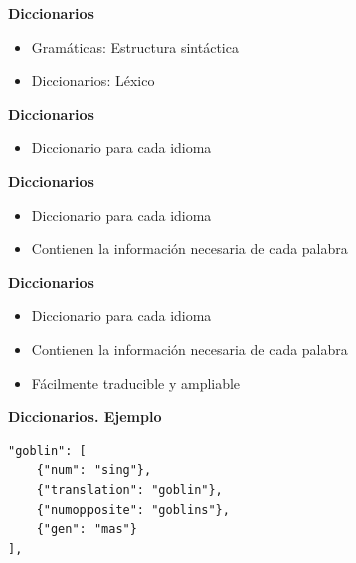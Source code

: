 
\begin{tframe}{\textbf{Diccionarios}}
	\begin{itemize}
		\item Gramáticas: Estructura sintáctica
		\item<+-| alert@+> Diccionarios: Léxico
	\end{itemize}
\end{tframe}

\begin{tframe}{\textbf{Diccionarios}}
	\begin{itemize}
		\item<+-| alert@+> Diccionario para cada idioma
	\end{itemize}
\end{tframe}

\begin{tframe}{\textbf{Diccionarios}}
	\begin{itemize}
		\item Diccionario para cada idioma
		\item<+-| alert@+> Contienen la información necesaria de cada palabra
	\end{itemize}
\end{tframe}

\begin{tframe}{\textbf{Diccionarios}}
	\begin{itemize}
		\item Diccionario para cada idioma
		\item Contienen la información necesaria de cada palabra
		\item<+-| alert@+> Fácilmente traducible y ampliable
	\end{itemize}
\end{tframe}

\begin{frame}[t, fragile]{\textbf{Diccionarios. Ejemplo}}
	\begin{Verbatim}
"goblin": [
    {"num": "sing"},
    {"translation": "goblin"},
    {"numopposite": "goblins"},
    {"gen": "mas"}
],
	\end{Verbatim}
\end{frame}


